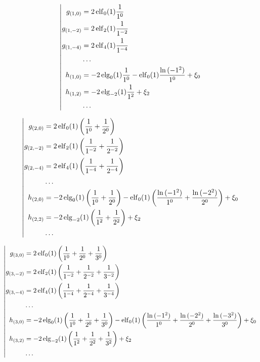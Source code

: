 \begin{equation*} \left| \begin{aligned}
g_{(1,0)} &=
  2 \elf_0(1) \frac{1}{1^0} \\
%
g_{(1,-2)} &=
  2 \elf_2(1) \frac{1}{1^{-2}} \\
%
g_{(1,-4)} &=
  2 \elf_4(1) \frac{1}{1^{-4}} \\
%
&\ldots \\
%
h_{(1,0)} &=
- 2 \elg_0(1) \frac{1}{1^0}
- \elf_0(1) \frac{\ln{(-1^2)}}{1^0}
+ \xi_0 \\
%
h_{(1,2)} &=
- 2 \elg_{-2}(1) \frac{1}{1^2}
+ \xi_2 \\
%
&\ldots \\
\end{aligned} \right. \end{equation*}

\begin{equation*} \left| \begin{aligned}
g_{(2,0)} &=
  2 \elf_0(1) \left(
  \frac{1}{1^0}
+ \frac{1}{2^0} \right) \\
%
g_{(2,-2)} &=
  2 \elf_2(1) \left(
  \frac{1}{1^{-2}}
+ \frac{1}{2^{-2}} \right) \\
%
g_{(2,-4)} &=
  2 \elf_4(1) \left(
  \frac{1}{1^{-4}}
+ \frac{1}{2^{-4}} \right) \\
%
&\ldots \\
%
h_{(2,0)} &=
- 2 \elg_0(1) \left(
  \frac{1}{1^0}
+ \frac{1}{2^0} \right)
- \elf_0(1) \left(
  \frac{\ln{(-1^2)}}{1^0}
+ \frac{\ln{(-2^2)}}{2^0} \right)
+ \xi_0 \\
%
h_{(2,2)} &=
- 2 \elg_{-2}(1) \left(
  \frac{1}{1^2}
+ \frac{1}{2^2} \right)
+ \xi_2 \\
%
&\ldots \\
\end{aligned} \right. \end{equation*}

\begin{equation*} \left| \begin{aligned}
g_{(3,0)} &=
  2 \elf_0(1) \left(
  \frac{1}{1^0}
+ \frac{1}{2^0}
+ \frac{1}{3^0} \right) \\
%
g_{(3,-2)} &=
  2 \elf_2(1) \left(
  \frac{1}{1^{-2}}
+ \frac{1}{2^{-2}}
+ \frac{1}{3^{-2}} \right) \\
%
g_{(3,-4)} &=
  2 \elf_4(1) \left(
  \frac{1}{1^{-4}}
+ \frac{1}{2^{-4}}
+ \frac{1}{3^{-4}} \right) \\
%
&\ldots \\
%
h_{(3,0)} &=
- 2 \elg_0(1) \left(
  \frac{1}{1^0}
+ \frac{1}{2^0}
+ \frac{1}{3^0} \right)
- \elf_0(1) \left(
  \frac{\ln{(-1^2)}}{1^0}
+ \frac{\ln{(-2^2)}}{2^0}
+ \frac{\ln{(-3^2)}}{3^0} \right)
+ \xi_0 \\
%
h_{(3,2)} &=
- 2 \elg_{-2}(1) \left(
  \frac{1}{1^2}
+ \frac{1}{2^2}
+ \frac{1}{3^2} \right)
+ \xi_2 \\
%
&\ldots \\
\end{aligned} \right. \end{equation*}